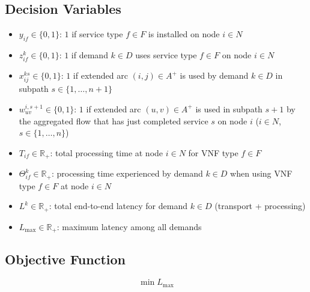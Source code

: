 \documentclass{article}
\begin{document}
\subsection*{Decision Variables}
\begin{itemize}
    \item $y_{if} \in \{0,1\}$: $1$ if service type $f \in F$ is installed on node $i \in N$
    \item $z_{if}^k \in \{0,1\}$: $1$ if demand $k \in D$ uses service type $f \in F$ on node $i \in N$
    \item $x_{ij}^{ks} \in \{0,1\}$: $1$ if extended arc $(i,j) \in A^+$ is used by demand $k \in D$ in subpath $s \in \{1, \dots, n+1\}$
    \item $w_{uv}^{i, s+1} \in \{0,1\}$: $1$ if extended arc $(u,v) \in A^+$ is used in subpath $s+1$ by the aggregated flow that has just completed service $s$ on node $i$ ($i \in N$, $s \in \{1, \dots, n\}$)
    \item $T_{if} \in \mathbb{R}_+$: total processing time at node $i \in N$ for VNF type $f \in F$
    \item $\Theta_{if}^k \in \mathbb{R}_+$: processing time experienced by demand $k \in D$ when using VNF type $f \in F$ at node $i \in N$
    \item $L^k \in \mathbb{R}_+$: total end-to-end latency for demand $k \in D$ (transport + processing)
    \item $L_{\max} \in \mathbb{R}_+$: maximum latency among all demands
\end{itemize}

\subsection*{Objective Function}
\begin{equation}
    \min L_{\max}
\end{equation}
\end{document}
